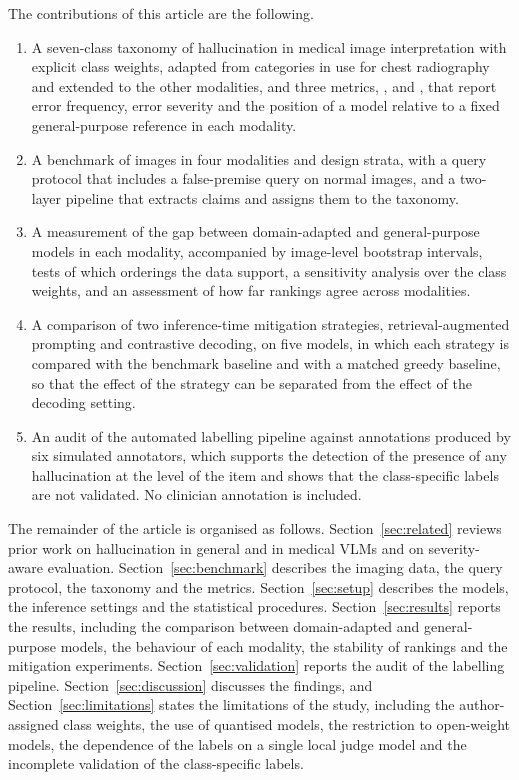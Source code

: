 The contributions of this article are the following.
\begin{enumerate}
  \item A seven-class taxonomy of hallucination in medical image interpretation with explicit class weights, adapted from categories in use for chest radiography and extended to the other modalities, and three metrics, \SMHR, \CHR{} and \SRI, that report error frequency, error severity and the position of a model relative to a fixed general-purpose reference in each modality.
  \item A benchmark of \Nimages{} images in four modalities and \Nstrata{} design strata, with a query protocol that includes a false-premise query on normal images, and a two-layer pipeline that extracts claims and assigns them to the taxonomy.
  \item A measurement of the gap between domain-adapted and general-purpose models in each modality, accompanied by image-level bootstrap intervals, tests of which orderings the data support, a sensitivity analysis over the class weights, and an assessment of how far rankings agree across modalities.
  \item A comparison of two inference-time mitigation strategies, retrieval-augmented prompting and contrastive decoding, on five models, in which each strategy is compared with the benchmark baseline and with a matched greedy baseline, so that the effect of the strategy can be separated from the effect of the decoding setting.
  \item An audit of the automated labelling pipeline against annotations produced by six simulated annotators, which supports the detection of the presence of any hallucination at the level of the item and shows that the class-specific labels are not validated. No clinician annotation is included.
\end{enumerate}

The remainder of the article is organised as follows. Section~\ref{sec:related} reviews prior work on hallucination in general and in medical VLMs and on severity-aware evaluation. Section~\ref{sec:benchmark} describes the imaging data, the query protocol, the taxonomy and the metrics. Section~\ref{sec:setup} describes the models, the inference settings and the statistical procedures. Section~\ref{sec:results} reports the results, including the comparison between domain-adapted and general-purpose models, the behaviour of each modality, the stability of rankings and the mitigation experiments. Section~\ref{sec:validation} reports the audit of the labelling pipeline. Section~\ref{sec:discussion} discusses the findings, and Section~\ref{sec:limitations} states the limitations of the study, including the author-assigned class weights, the use of quantised models, the restriction to open-weight models, the dependence of the labels on a single local judge model and the incomplete validation of the class-specific labels.
